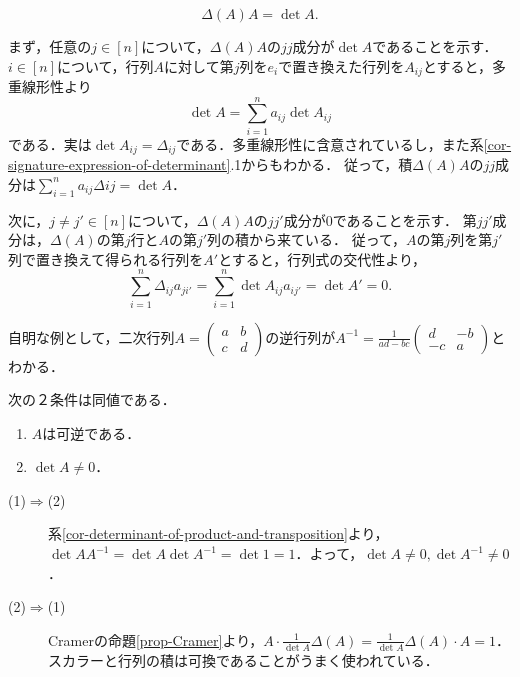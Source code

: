 \documentclass[uplatex, dvipdfmx]{jsreport}
\begin{document}
\begin{proposition}[Cramer]\label{prop-Cramer}
    \[\Delta(A)A=\det A.\]
\end{proposition}
\begin{Proof}
    まず，任意の$j\in[n]$について，$\Delta(A)A$の$jj$成分が$\det A$であることを示す．
    $i\in[n]$について，行列$A$に対して第$j$列を$e_i$で置き換えた行列を$A_{ij}$とすると，多重線形性より
    \[\det A=\sum^n_{i=1}a_{ij}\det A_{ij}\]
    である．実は$\det A_{ij}=\Delta_{ij}$である．多重線形性に含意されているし，また系\ref{cor-signature-expression-of-determinant}.1からもわかる．
    従って，積$\Delta(A)A$の$jj$成分は$\sum^n_{i=1}a_{ij}\Delta{ij}=\det A$．

    次に，$j\ne j'\in[n]$について，$\Delta(A)A$の$jj'$成分が$0$であることを示す．
    第$jj'$成分は，$\Delta(A)$の第$j$行と$A$の第$j'$列の積から来ている．
    従って，$A$の第$j$列を第$j'$列で置き換えて得られる行列を$A'$とすると，行列式の交代性より，
    \[\sum^n_{i=1}\Delta_{ij}a_{ji'}=\sum^n_{i=1}\det A_{ij}a_{ij'}=\det A'=0.\]
\end{Proof}

\begin{example}
    自明な例として，二次行列$A=\begin{pmatrix}a&b\\c&d\end{pmatrix}$の逆行列が$A^{-1}=\frac{1}{ad-bc}\begin{pmatrix}d&-b\\-c&a\end{pmatrix}$とわかる．
\end{example}

\begin{corollary}\label{cor-characterization-of-invertibility}
    次の２条件は同値である．
    \begin{enumerate}
        \item $A$は可逆である．
        \item $\det A\ne 0$．
    \end{enumerate}
\end{corollary}
\begin{Proof}\mbox{}
    \begin{description}
        \item[(1)$\Rightarrow$(2)] 系\ref{cor-determinant-of-product-and-transposition}より，$\det AA^{-1}=\det A\det A^{-1}=\det 1=1$．よって，$\det A\ne 0,\det A^{-1}\ne 0$．
        \item[(2)$\Rightarrow$(1)] Cramerの命題\ref{prop-Cramer}より，$A\cdot\frac{1}{\det A}\Delta(A)=\frac{1}{\det A}\Delta(A)\cdot A=1$．スカラーと行列の積は可換であることがうまく使われている．
    \end{description}
\end{Proof}
\end{document}
